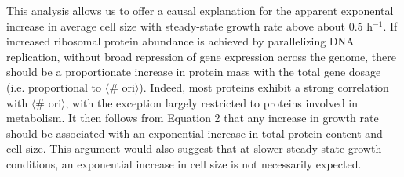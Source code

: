 
This analysis allows us to offer a causal explanation for the apparent
exponental increase in average cell size with steady-state growth rate above
about 0.5 h$^{-1}$. If increased ribosomal protein abundance is achieved by
parallelizing DNA replication, without broad repression of gene expression across
the genome, there should be a proportionate increase in protein mass with the total gene
dosage (i.e. proportional to $\langle$\# ori$\rangle$). Indeed, most proteins
exhibit a strong correlation with $\langle$\# ori$\rangle$, with the exception
largely restricted to proteins involved in metabolism. It then follows from
Equation 2 that any increase in growth rate should be associated with an
exponential increase in total protein content and cell size. This argument would
also suggest that at slower steady-state growth conditions, an exponential
increase in cell size is not necessarily expected.

%

